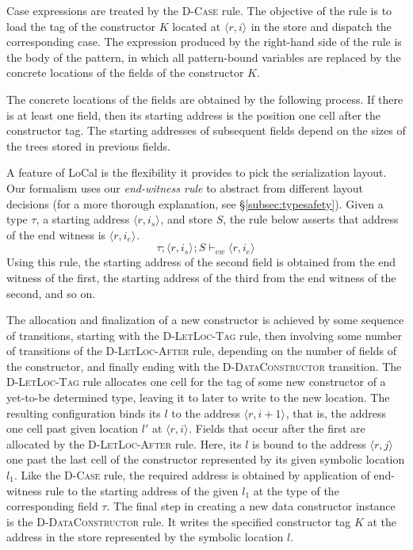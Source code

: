 \documentclass[showabstract,showacknowledgments,showpreface,showdedication,school]{iuphd}
\theoremstyle{nonumberplain}
\newcommand{\sysname}[0]{LoCal\xspace}
\newcommand{\ourcalc}[0]{\sysname}
\newcommand{\keywd}[1]{\mathit{#1}}
\newcommand{\skeywd}[1]{\mathit{#1}}
\newcommand{\DC}{\keywd{K}}
\newcommand{\TYP}{\keywd{\tau}}
\newcommand{\loc}{\skeywd{l}}
\newcommand{\concreteloc}[3]{\ensuremath{\langle #1, #2 \rangle ^{#3}}}
\newcommand{\reg}{\skeywd{r}}
\newcommand{\ind}{\keywd{i}}
\newcommand{\STOR}{\keywd{S}}
\newcommand{\ewitness}[4]{\ensuremath{#1;#2;#3 \vdash_{ew} #4}}
\newcommand{\ddatacon}{D-DataConstructor}
\newcommand{\dletloctag}{D-LetLoc-Tag}
\newcommand{\dletlocafter}{D-LetLoc-After}
\newcommand{\dcase}{D-Case}
\newcommand{\secref}[1]{\S\ref{#1}}
\begin{document}
Case expressions are treated by the \textsc{\dcase{}} rule.
The objective of the rule is to load the tag of the constructor $\DC$
located at $\concreteloc{\reg}{\ind}{}$ in the store and dispatch
the corresponding case.
The expression produced by the right-hand side of the rule is the body
of the pattern, in which all pattern-bound variables are replaced by
the concrete locations of the fields of the constructor $\DC$.

The concrete locations of the fields are obtained by the following
process.
If there is at least one field, then its starting address is the
position one cell after the constructor tag.
The starting addresses of subsequent fields depend on the sizes of the
trees stored in previous fields.

A feature of \ourcalc{} is the flexibility it provides to pick the
serialization layout.
Our formalism uses our \emph{end-witness rule} to abstract from different layout
decisions (for a more thorough explanation, see \secref{subsec:typesafety}).
Given a type $\TYP$, a starting address
$\concreteloc{\reg}{\ind_{s}}{}$, and store $\STOR$, the rule below
asserts that address of the end witness is
$\concreteloc{\reg}{\ind_{e}}{}$.
\begin{displaymath}
  \ewitness{\TYP}{\concreteloc{\reg}{\ind_{s}}{}}{\STOR}{\concreteloc{\reg}{\ind_{e}}{}}
\end{displaymath}
Using this rule, the starting address of the second field is obtained
from the end witness of the first, the starting address of the
third from the end witness of the second, and so on.

The allocation and finalization of a new constructor is achieved by
some sequence of transitions, starting with the \textsc{\dletloctag{}} rule, then
involving some number of transitions of the \textsc{\dletlocafter{}} rule,
depending on the number of fields of the constructor, and finally
ending with the \textsc{\ddatacon{}} transition.
The \textsc{\dletloctag{}} rule allocates one cell for the tag of some new
constructor of a yet-to-be determined type, leaving it to later to
write to the new location.
The resulting configuration binds its $\loc$ to the address
$\concreteloc{\reg}{\ind+1}{}$, that is, the address one cell past
given location $\loc'$ at $\concreteloc{\reg}{\ind}{}$.
Fields that occur after the first are allocated by the
\textsc{\dletlocafter{}} rule.
Here, its $\loc$ is bound to the address \concreteloc{\reg}{j}{} one
past the last cell of the constructor represented by its given
symbolic location $\loc_1$.
Like the \textsc{\dcase{}} rule, the required address is obtained by
application of end-witness rule to the starting address of the given
$\loc_1$ at the type of the corresponding field $\TYP$.
The final step in creating a new data constructor instance
is the \textsc{\ddatacon{}} rule.
It writes the specified constructor tag $\DC$ at the address in the
store represented by the symbolic location $\loc$.
\end{document}
